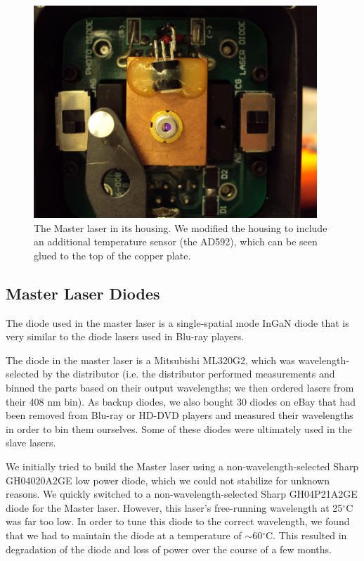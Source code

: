 \begin{figure}
\centerline{
\includegraphics[width=0.95\textwidth]{laser_on_in_housing.JPG}}
\caption[Photograph of Master Laser Diode]{\label{master_laser_interior_photo} The Master laser in its housing. We modified the housing to include an additional temperature sensor (the AD592), which can be seen glued to the top of the copper plate.}
\end{figure}

\subsection{Master Laser Diodes}
The diode used in the master laser is a single-spatial mode InGaN diode that is very similar to the diode lasers used in Blu-ray players. 

The diode in the master laser is a Mitsubishi ML320G2, which was wavelength-selected by the distributor (i.e. the distributor performed measurements and binned the parts based on their output wavelengths; we then ordered lasers from their 408 nm bin).
As backup diodes, we also bought 30 diodes on eBay that had been removed from Blu-ray or HD-DVD players and measured their wavelengths in order to bin them ourselves. Some of these diodes were ultimately used in the slave lasers.

We initially tried to build the Master laser using a non-wavelength-selected Sharp GH04020A2GE low power diode, which we could not stabilize for unknown reasons. We quickly switched to a non-wavelength-selected Sharp GH04P21A2GE diode for the Master laser. However, this laser's free-running wavelength at 25$^\circ$C was far too low. In order to tune this diode to the correct wavelength, we found that we had to maintain the diode at a temperature of $\sim$60$^\circ$C. This resulted in degradation of the diode and loss of power over the course of a few months.

